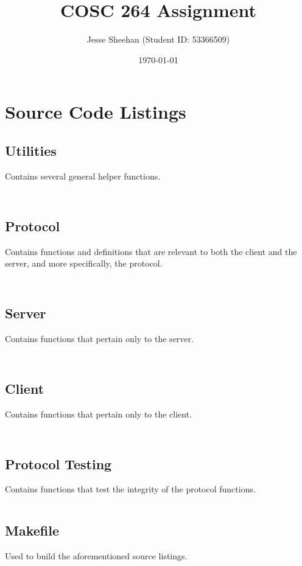 \documentclass[11pt]{article} %
\title{COSC 264 Assignment}
\date{\today}
\author{Jesse Sheehan (Student ID: 53366509)}
\newcommand{\includecode}[2][c]{\begin{mdframed}\inputminted[linenos=true, breaklines]{#1}{#2}\end{mdframed}}
\begin{document}
\begin{titlepage}

\maketitle

\hrulefill

\tableofcontents

\end{titlepage}
\setcounter{page}{2}


\section{Source Code Listings}

\subsection{Utilities}
Contains several general helper functions.
\includecode{../src/utils.h}
\includecode{../src/utils.c}

\newpage
\subsection{Protocol}
Contains functions and definitions that are relevant to both the client and the server, and more specifically, the protocol.
\includecode{../src/protocol.h}
\includecode{../src/protocol.c}

\newpage
\subsection{Server}
Contains functions that pertain only to the server.
\includecode{../src/server.h}
\includecode{../src/server.c}

\newpage
\subsection{Client}
Contains functions that pertain only to the client.
\includecode{../src/client.h}
\includecode{../src/client.c}

\newpage
\subsection{Protocol Testing}
Contains functions that test the integrity of the protocol functions.
\includecode{../src/test/protocol.test.c}

\newpage
\subsection{Makefile}
Used to build the aforementioned source listings.
\includecode[make]{../Makefile}
\end{document}
